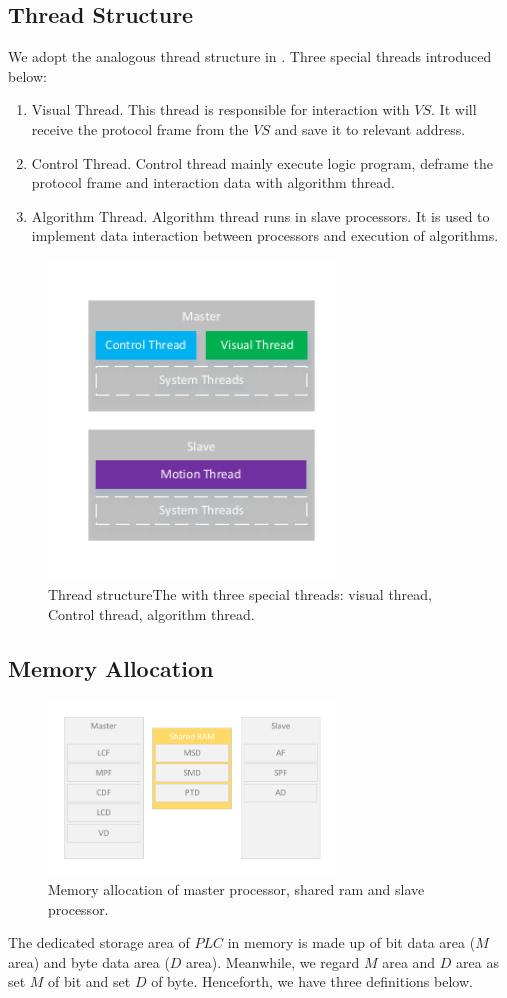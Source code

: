 \documentclass[journal,UTF8]{IEEEtran}
\begin{document}
\subsection{Thread Structure}
We adopt the analogous thread structure in \cite{wu2018customized}. Three special threads introduced below:
\begin{enumerate}
	\item Visual Thread. This thread is responsible for interaction with $VS$. It will receive the protocol frame from the $VS$ and save it to relevant address. 
	\item Control Thread. Control thread mainly execute logic program, deframe the protocol frame and interaction data with algorithm thread.
	\item Algorithm Thread. Algorithm thread runs in slave processors. It is used to implement data interaction between processors and execution of algorithms.
\end{enumerate}

\begin{figure}
	\centering
	\includegraphics[width=3in]{fig/Threads.pdf}
	\caption{ Thread structureThe with three special threads: visual thread, Control thread, algorithm thread.}
	\label{fig:Threads}
\end{figure}
\subsection{Memory Allocation}
\begin{figure}
	\centering
	\includegraphics[width=3in]{fig/RAM.pdf}
	\caption{Memory allocation of master processor, shared ram and slave processor.}
	\label{fig:RAM}
\end{figure}
The dedicated storage area of $PLC$ in memory is made up of bit data area ($M$ area) and byte data area ($D$ area). Meanwhile, we regard $M$ area and $D$ area as set $M$ of bit and set $D$ of byte. Henceforth, we have three definitions below.
\end{document}
